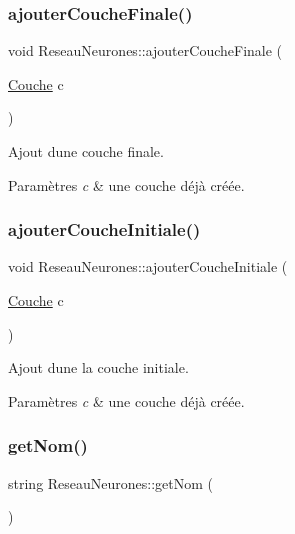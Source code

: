 \subsubsection{\texorpdfstring{ajouter\+Couche\+Finale()}{ajouterCoucheFinale()}}
{\footnotesize\ttfamily void Reseau\+Neurones\+::ajouter\+Couche\+Finale (\begin{DoxyParamCaption}\item[{\hyperlink{class_couche}{Couche}}]{c }\end{DoxyParamCaption})}



Ajout d\textquotesingle{}une couche finale. 


\begin{DoxyParams}{Paramètres}
{\em c} & une couche déjà créée. \\
\hline
\end{DoxyParams}
\mbox{\label{class_reseau_neurones_a21335ab1fa9c375290cb36cb06d77c79}} 
\subsubsection{\texorpdfstring{ajouter\+Couche\+Initiale()}{ajouterCoucheInitiale()}}
{\footnotesize\ttfamily void Reseau\+Neurones\+::ajouter\+Couche\+Initiale (\begin{DoxyParamCaption}\item[{\hyperlink{class_couche}{Couche}}]{c }\end{DoxyParamCaption})}



Ajout d\textquotesingle{}une la couche initiale. 


\begin{DoxyParams}{Paramètres}
{\em c} & une couche déjà créée. \\
\hline
\end{DoxyParams}
\mbox{\label{class_reseau_neurones_a3dff69c97c748171ca5bacfe521e9063}} 
\subsubsection{\texorpdfstring{get\+Nom()}{getNom()}}
{\footnotesize\ttfamily string Reseau\+Neurones\+::get\+Nom (\begin{DoxyParamCaption}{ }\end{DoxyParamCaption})}




